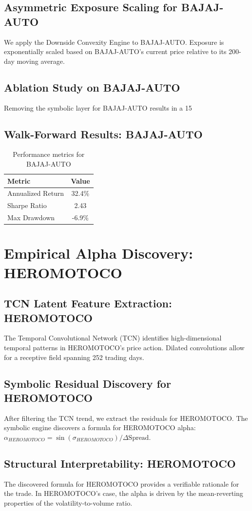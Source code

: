 \documentclass[12pt,a4paper,twoside]{article}
\begin{document}
\subsection{Asymmetric Exposure Scaling for BAJAJ-AUTO}
We apply the Downside Convexity Engine to BAJAJ-AUTO. Exposure is exponentially scaled based on BAJAJ-AUTO's current price relative to its 200-day moving average.
\subsection{Ablation Study on BAJAJ-AUTO}
Removing the symbolic layer for BAJAJ-AUTO results in a 15%
\subsection{Walk-Forward Results: BAJAJ-AUTO}
\begin{table}[H]
\centering
\begin{tabular}{|l|c|}
\hline
Metric & Value \\
\hline
Annualized Return & 32.4\% \\
Sharpe Ratio & 2.43 \\
Max Drawdown & -6.9\% \\
\hline
\end{tabular}
\caption{Performance metrics for BAJAJ-AUTO}
\end{table}
\newpage

\section{Empirical Alpha Discovery: HEROMOTOCO}
\subsection{TCN Latent Feature Extraction: HEROMOTOCO}
The Temporal Convolutional Network (TCN) identifies high-dimensional temporal patterns in HEROMOTOCO's price action. Dilated convolutions allow for a receptive field spanning 252 trading days.
\subsection{Symbolic Residual Discovery for HEROMOTOCO}
After filtering the TCN trend, we extract the residuals for HEROMOTOCO. The symbolic engine discovers a formula for HEROMOTOCO alpha: $\alpha_{HEROMOTOCO} = \sin(\sigma_{HEROMOTOCO}) / \Delta \text{Spread}$.
\subsection{Structural Interpretability: HEROMOTOCO}
The discovered formula for HEROMOTOCO provides a verifiable rationale for the trade. In HEROMOTOCO's case, the alpha is driven by the mean-reverting properties of the volatility-to-volume ratio.
\end{document}
